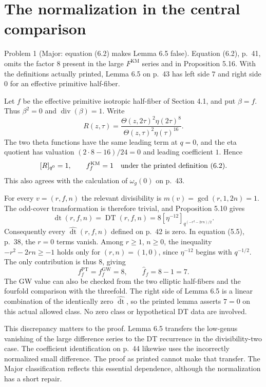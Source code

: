 \documentclass[10pt]{article}
\begin{document}
\section*{The normalization in the central comparison}
Problem 1 (Major: equation (6.2) makes Lemma 6.5 false).  Equation (6.2), p. 41, omits the factor \(8\) present in the large \(F^{\mathrm{KM}}\) series and in Proposition 5.16. With the definitions actually printed, Lemma 6.5 on p. 43 has left side \(7\) and right side \(0\) for an effective primitive half-fiber.\par
Let \(f\) be the effective primitive isotropic half-fiber of Section 4.1, and put \(\beta=f\). Thus \(\beta^2=0\) and \(\operatorname{div}(\beta)=1\). Write \[R(z,\tau)=
 \frac{\Theta(z,2\tau)^2\eta(2\tau)^8}
      {\Theta(z,\tau)^2\eta(\tau)^{16}}.\] The two theta functions have the same leading term at \(q=0\), and the eta quotient has valuation \((2\cdot8-16)/24=0\) and leading coefficient \(1\). Hence \[[R]_{q^0}=1,\qquad f_f^{\mathrm{KM}}=1
 \quad\hbox{under the printed definition (6.2).}\] This also agrees with the calculation of \(\omega_g(0)\) on p. 43.\par
For every \(v=(r,f,n)\) the relevant divisibility is \(m(v)=\gcd(r,1,2n)=1\). The odd-cover transformation is therefore trivial, and Proposition 5.10 gives \[\mathop{\mathrm{dt}}(r,f,n)=\mathop{\mathrm{DT}}(r,f,n)
 =8[\eta^{-12}]_{q^{(-r^2-2rn)/2}}.\] Consequently every \(\widehat{\mathop{\mathrm{dt}}}(r,f,n)\) defined on p. 42 is zero. In equation (5.5), p. 38, the \(r=0\) terms vanish. Among \(r\ge1\), \(n\ge0\), the inequality \(-r^2-2rn\ge-1\) holds only for \((r,n)=(1,0)\), since \(\eta^{-12}\) begins with \(q^{-1/2}\). The only contribution is thus \(8\), giving \[f_f^{\mathrm{PT}}=f_f^{\mathrm{GW}}=8,\qquad
 \widehat f_f=8-1=7.\] The GW value can also be checked from the two elliptic half-fibers and the fourfold comparison with the threefold. The right side of Lemma 6.5 is a linear combination of the identically zero \(\widehat{\mathop{\mathrm{dt}}}\), so the printed lemma asserts \(7=0\) on this actual allowed class. No zero class or hypothetical DT data are involved.\par
This discrepancy matters to the proof. Lemma 6.5 transfers the low-genus vanishing of the large difference series to the DT recurrence in the divisibility-two case. The coefficient identification on p. 44 likewise uses the incorrectly normalized small difference. The proof as printed cannot make that transfer. The Major classification reflects this essential dependence, although the normalization has a short repair.\par
\end{document}
